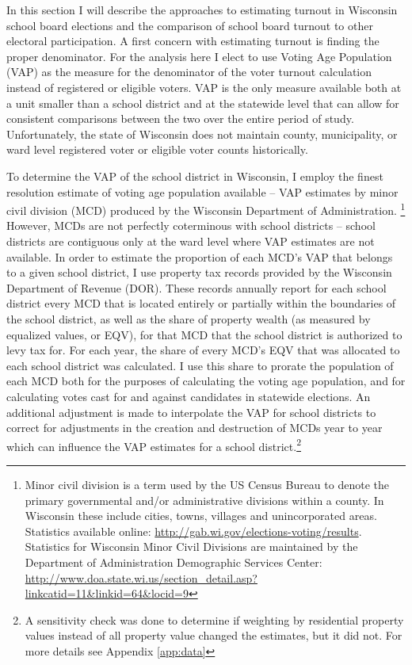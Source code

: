 In this section I will describe the approaches to estimating turnout in Wisconsin 
school board elections and the comparison of school board turnout to other 
electoral participation. A first concern with estimating turnout is finding the 
proper denominator. For the analysis here I elect to use Voting Age Population 
(VAP) as the measure for 
the denominator of the voter turnout calculation instead of registered or eligible 
voters. VAP is the only measure available both at a unit smaller than a school district 
and at the statewide level that can allow for consistent comparisons between the two over 
the entire period of study. Unfortunately, the state of Wisconsin does not maintain 
county, municipality, or ward level registered voter or eligible voter counts 
historically.

To determine the VAP of the school district in Wisconsin, I employ the finest 
resolution estimate of voting age population available -- VAP estimates by minor 
civil division (MCD) produced by the Wisconsin Department of Administration.
\footnote{ Minor civil division is a term used by the US Census Bureau to denote 
the primary governmental and/or administrative divisions within a county. In 
Wisconsin these include cities, towns, villages and unincorporated areas. 
Statistics available online: \url{http://gab.wi.gov/elections-voting/results}. 
Statistics for Wisconsin Minor Civil Divisions are maintained by the Department 
of Administration Demographic Services Center: 
\url{http://www.doa.state.wi.us/section\_detail.asp?linkcatid=11\&linkid=64\&locid=9}}
However, MCDs are not perfectly coterminous with school districts -- school districts 
are contiguous only at the ward level where VAP estimates are not available. In 
order to estimate the proportion of each MCD's VAP that belongs to a given school
district, I use property tax records provided by the Wisconsin Department of 
Revenue (DOR). These records annually report for each school district every MCD 
that is located entirely or partially within the boundaries of the school district, 
as well as the share of property wealth (as measured by equalized values, or EQV), 
for that MCD that the school district 
is authorized to levy tax for. For each year, the share of every MCD's EQV that 
was allocated to each school district was calculated. I use this share to 
prorate the population of each MCD both for the purposes of 
calculating the voting age population, and for calculating votes cast for and 
against candidates in statewide elections. An additional adjustment 
is made to interpolate the VAP for school districts to correct for adjustments in 
the creation and destruction of MCDs year to year which can influence the VAP 
estimates for a school district.\footnote{A sensitivity check was done 
to determine if weighting by residential property values  instead of all property 
value changed the estimates, but it did not. For more details see Appendix \ref{app:data}}

